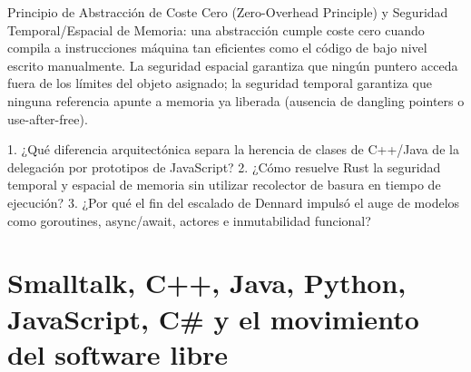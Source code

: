 \documentclass{book}
\begin{document}
\begin{tcolorbox}[title={Definición}, studiumdef, breakable]

Principio de Abstracción de Coste Cero (Zero-Overhead Principle) y Seguridad Temporal/Espacial de Memoria: una abstracción cumple coste cero cuando compila a instrucciones máquina tan eficientes como el código de bajo nivel escrito manualmente. La seguridad espacial garantiza que ningún puntero acceda fuera de los límites del objeto asignado; la seguridad temporal garantiza que ninguna referencia apunte a memoria ya liberada (ausencia de dangling pointers o use-after-free).
\end{tcolorbox}

\begin{tcolorbox}[title={Autoficha}, studiumcheck, breakable]

1. ¿Qué diferencia arquitectónica separa la herencia de clases de C++/Java de la delegación por prototipos de JavaScript? 2. ¿Cómo resuelve Rust la seguridad temporal y espacial de memoria sin utilizar recolector de basura en tiempo de ejecución? 3. ¿Por qué el fin del escalado de Dennard impulsó el auge de modelos como goroutines, async/await, actores e inmutabilidad funcional?
\end{tcolorbox}

\section{Smalltalk, C++, Java, Python, JavaScript, C\# y el movimiento del software libre}
\end{document}
